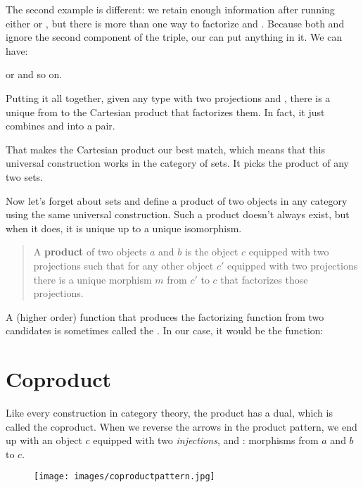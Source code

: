 The second example is different: we retain enough information after
running either  or , but there is more than one way
to factorize  and . Because both  and
 ignore the second component of the triple, our 
can put anything in it. We can have:


or
and so on.

Putting it all together, given any type  with two projections
 and , there is a unique  from 
to the Cartesian product  that factorizes them. In fact,
it just combines  and  into a pair.

That makes the Cartesian product  our best match, which
means that this universal construction works in the category of sets. It
picks the product of any two sets.

Now let's forget about sets and define a product of two objects in any
category using the same universal construction. Such a product doesn't
always exist, but when it does, it is unique up to a unique isomorphism.

\begin{quote}
  A \textbf{product} of two objects $a$ and $b$ is the object
  $c$ equipped with two projections such that for any other object
  $c'$ equipped with two projections there is a unique morphism
  $m$ from $c'$ to $c$ that factorizes those projections.
\end{quote}

\noindent
A (higher order) function that produces the factorizing function
 from two candidates is sometimes called the
. In our case, it would be the function:


\section{Coproduct}

Like every construction in category theory, the product has a dual,
which is called the coproduct. When we reverse the arrows in the product
pattern, we end up with an object $c$ equipped with two
\emph{injections},  and : morphisms from $a$
and $b$ to $c$.


\begin{figure}[H]
  \centering
  \texttt{[image: images/coproductpattern.jpg]}
\end{figure}

